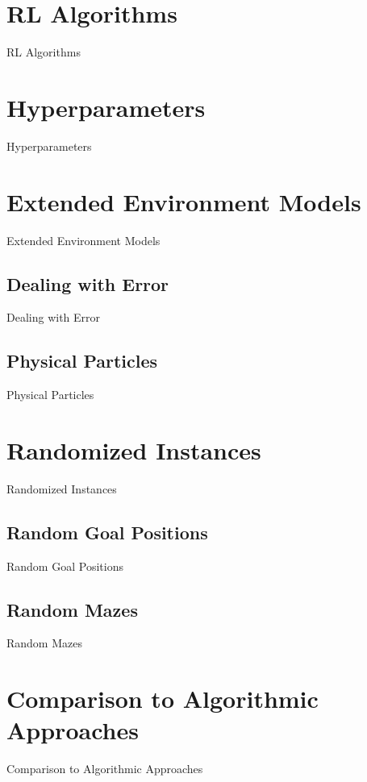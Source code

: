\section{RL Algorithms} \label{sec:EvalRLAlgorithms}
RL Algorithms
\section{Hyperparameters} \label{sec:EvalParameters}
Hyperparameters
\section{Extended Environment Models} \label{sec:EvalExtendedModels}
Extended Environment Models
\subsection{Dealing with Error} \label{sec:EvalError}
Dealing with Error
\subsection{Physical Particles} \label{sec:EvalPhysical}
Physical Particles
\section{Randomized Instances} \label{sec:EvalRandomness}
Randomized Instances
\subsection{Random Goal Positions} \label{sec:EvalRandomGoals}
Random Goal Positions
\subsection{Random Mazes} \label{sec:EvalRandomMaze}
Random Mazes
\section{Comparison to Algorithmic Approaches} \label{sec:EvalAlgorithms}
Comparison to Algorithmic Approaches